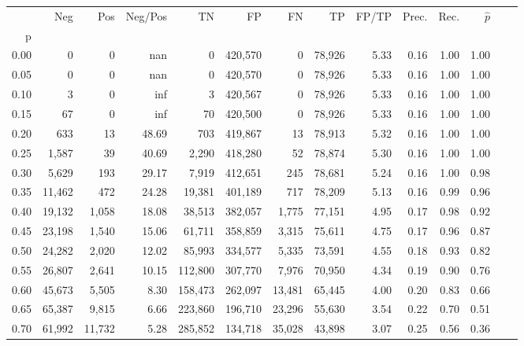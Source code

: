\begin{tabular}{rrrrrrrrrrrrrr}
\toprule
{} &     Neg &     Pos & Neg/Pos &       TN &       FP &      FN &      TP & FP/TP & Prec. &  Rec. & $\hat{p}$ \\
p    &         &         &         &          &          &         &         &       &       &       &           \\
\midrule
0.00 &       0 &       0 &     nan &        0 &  420,570 &       0 &  78,926 &  5.33 &  0.16 &  1.00 &      1.00 \\
0.05 &       0 &       0 &     nan &        0 &  420,570 &       0 &  78,926 &  5.33 &  0.16 &  1.00 &      1.00 \\
0.10 &       3 &       0 &     inf &        3 &  420,567 &       0 &  78,926 &  5.33 &  0.16 &  1.00 &      1.00 \\
0.15 &      67 &       0 &     inf &       70 &  420,500 &       0 &  78,926 &  5.33 &  0.16 &  1.00 &      1.00 \\
0.20 &     633 &      13 &   48.69 &      703 &  419,867 &      13 &  78,913 &  5.32 &  0.16 &  1.00 &      1.00 \\
0.25 &   1,587 &      39 &   40.69 &    2,290 &  418,280 &      52 &  78,874 &  5.30 &  0.16 &  1.00 &      1.00 \\
0.30 &   5,629 &     193 &   29.17 &    7,919 &  412,651 &     245 &  78,681 &  5.24 &  0.16 &  1.00 &      0.98 \\
0.35 &  11,462 &     472 &   24.28 &   19,381 &  401,189 &     717 &  78,209 &  5.13 &  0.16 &  0.99 &      0.96 \\
0.40 &  19,132 &   1,058 &   18.08 &   38,513 &  382,057 &   1,775 &  77,151 &  4.95 &  0.17 &  0.98 &      0.92 \\
0.45 &  23,198 &   1,540 &   15.06 &   61,711 &  358,859 &   3,315 &  75,611 &  4.75 &  0.17 &  0.96 &      0.87 \\
0.50 &  24,282 &   2,020 &   12.02 &   85,993 &  334,577 &   5,335 &  73,591 &  4.55 &  0.18 &  0.93 &      0.82 \\
0.55 &  26,807 &   2,641 &   10.15 &  112,800 &  307,770 &   7,976 &  70,950 &  4.34 &  0.19 &  0.90 &      0.76 \\
0.60 &  45,673 &   5,505 &    8.30 &  158,473 &  262,097 &  13,481 &  65,445 &  4.00 &  0.20 &  0.83 &      0.66 \\
0.65 &  65,387 &   9,815 &    6.66 &  223,860 &  196,710 &  23,296 &  55,630 &  3.54 &  0.22 &  0.70 &      0.51 \\
0.70 &  61,992 &  11,732 &    5.28 &  285,852 &  134,718 &  35,028 &  43,898 &  3.07 &  0.25 &  0.56 &      0.36 \\

\end{tabular}
